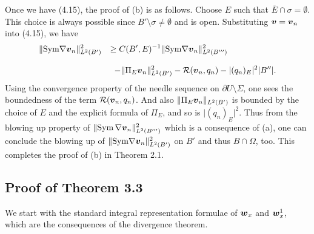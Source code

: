 Once we have (4.15), the proof of (b) is as follows.
Choose $E$ such that $\overline{E}\cap\sigma=\emptyset$.
This choice is always possible since $B'\setminus\sigma\not=\emptyset$ and is open.   
Substituting $\mbox{\boldmath $v$}=\mbox{\boldmath $v$}_n$ into (4.15), we have
$$\begin{array}{ll}
\displaystyle
\Vert\text{Sym}\nabla\mbox{\boldmath $v$}_n\Vert_{L^2(B')}^2
&
\displaystyle
\ge
C(B',E)^{-1}
\Vert\text{Sym}\nabla\mbox{\boldmath $v$}_n\Vert_{L^2(B''')}^2
\\
\\
\displaystyle
&
\displaystyle
\,\,\,
-\Vert\Pi_{E}\mbox{\boldmath $v$}_n\Vert_{L^2(B')}^2-{\cal R}(\mbox{\boldmath $v$}_n,q_n)
-\vert (q_n)_E\vert^2\vert B''\vert.
\end{array}
$$
Using the convergence property of the needle sequence on $\partial U\setminus\Sigma$, one sees the boundedness of  the term ${\cal R}(\mbox{\boldmath $v$}_n,q_n)$.
And also $\Vert\Pi_E\mbox{\boldmath $v$}_n\Vert_{L^2(B')}$ is bounded by the choice of $E$
and the explicit formula of $\Pi_E$, and so is $\vert (q_n)_E\vert^2$.
Thus from the blowing up property of $\Vert\text{Sym}\,\nabla\mbox{\boldmath $v$}_n\Vert_{L^2(B''')}^2$
which is a consequence of  (a), one can conclude the blowing up
of  $\Vert\text{Sym}\nabla\mbox{\boldmath $v$}_n\Vert_{L^2(B')}^2$
 on $B'$ and thus $B\cap\Omega$, too.
This completes the proof of (b) in Theorem 2.1.

































\subsection{Proof of Theorem 3.3}


We start with the standard integral representation formulae  of $\mbox{\boldmath $w$}_x$ and $\mbox{\boldmath $w$}_x^1$, which are the consequences of the divergence theorem.

